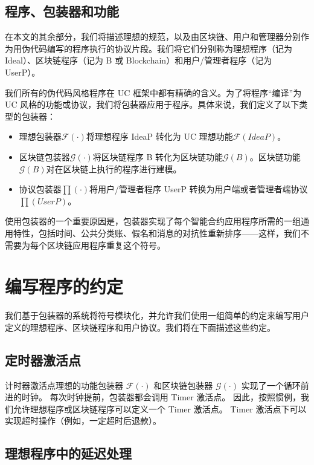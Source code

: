 \documentclass{xduugtrans}
\begin{document}
\subsection{程序、包装器和功能}

在本文的其余部分，我们将描述理想的规范，以及由区块链、用户和管理器分别作为用伪代码编写的程序执行的协议片段。我们将它们分别称为理想程序（记为 Ideal）、区块链程序（记为 B 或 Blockchain）和用户/管理者程序（记为 UserP）。

我们所有的伪代码风格程序在 UC 框架中都有精确的含义。为了将程序“编译”为 UC 风格的功能或协议，我们将包装器应用于程序。具体来说，我们定义了以下类型的包装器：

\begin{itemize}
    \item 理想包装器$\mathcal{F} ( \cdot )$将理想程序 IdeaP 转化为 UC 理想功能$\mathcal{F} ( IdeaP )$。
    \item 区块链包装器$\mathcal{G} ( \cdot )$将区块链程序 B 转化为区块链功能$\mathcal{G} ( B )$。区块链功能$\mathcal{G} ( B )$对在区块链上执行的程序进行建模。
    \item 协议包装器$\prod ( \cdot )$将用户/管理者程序 UserP 转换为用户端或者管理者端协议$\prod ( UserP )$。
\end{itemize}

使用包装器的一个重要原因是，包装器实现了每个智能合约应用程序所需的一组通用特性，包括时间、公共分类账、假名和消息的对抗性重新排序——这样，我们不需要为每个区块链应用程序重复这个符号。

\section{编写程序的约定}

我们基于包装器的系统将符号模块化，并允许我们使用一组简单的约定来编写用户定义的理想程序、区块链程序和用户协议。我们将在下面描述这些约定。

\subsection{定时器激活点}

计时器激活点理想的功能包装器 $\mathcal{F} ( \cdot )$ 和区块链包装器 $\mathcal{G} ( \cdot )$ 实现了一个循环前进的时钟。 每次时钟提前，包装器都会调用 Timer 激活点。 因此，按照惯例，我们允许理想程序或区块链程序可以定义一个 Timer 激活点。 Timer 激活点下可以实现超时操作（例如，一定超时后退款）。

\subsection{理想程序中的延迟处理}
\end{document}
